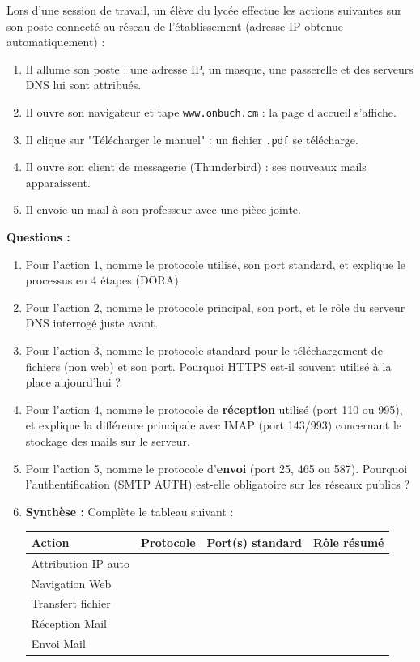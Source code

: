 \documentclass[11pt]{article}
\begin{document}
\begin{exercice}
Lors d'une session de travail, un élève du lycée effectue les actions suivantes sur son poste connecté au réseau de l'établissement (adresse IP obtenue automatiquement) :
\begin{enumerate}
    \item Il allume son poste : une adresse IP, un masque, une passerelle et des serveurs DNS lui sont attribués.
    \item Il ouvre son navigateur et tape \texttt{www.onbuch.cm} : la page d'accueil s'affiche.
    \item Il clique sur "Télécharger le manuel" : un fichier \texttt{.pdf} se télécharge.
    \item Il ouvre son client de messagerie (Thunderbird) : ses nouveaux mails apparaissent.
    \item Il envoie un mail à son professeur avec une pièce jointe.
\end{enumerate}
\textbf{Questions :}
\begin{enumerate}
    \item Pour l'action 1, nomme le protocole utilisé, son port standard, et explique le processus en 4 étapes (DORA).
    \item Pour l'action 2, nomme le protocole principal, son port, et le rôle du serveur DNS interrogé juste avant.
    \item Pour l'action 3, nomme le protocole standard pour le téléchargement de fichiers (non web) et son port. Pourquoi HTTPS est-il souvent utilisé à la place aujourd'hui ?
    \item Pour l'action 4, nomme le protocole de \textbf{réception} utilisé (port 110 ou 995), et explique la différence principale avec IMAP (port 143/993) concernant le stockage des mails sur le serveur.
    \item Pour l'action 5, nomme le protocole d'\textbf{envoi} (port 25, 465 ou 587). Pourquoi l'authentification (SMTP AUTH) est-elle obligatoire sur les réseaux publics ?
    \item \textbf{Synthèse :} Complète le tableau suivant :
    \begin{center}
    \begin{tabular}{|l|l|l|l|}
    \hline
    \rowcolor{popblueL}
    \textbf{Action} & \textbf{Protocole} & \textbf{Port(s) standard} & \textbf{Rôle résumé} \\
    \hline
    Attribution IP auto & & & \\
    \hline
    Navigation Web & & & \\
    \hline
    Transfert fichier & & & \\
    \hline
    Réception Mail & & & \\
    \hline
    Envoi Mail & & & \\
    \hline
    \end{tabular}
    \end{center}
\end{enumerate}
\end{exercice}
\end{document}
